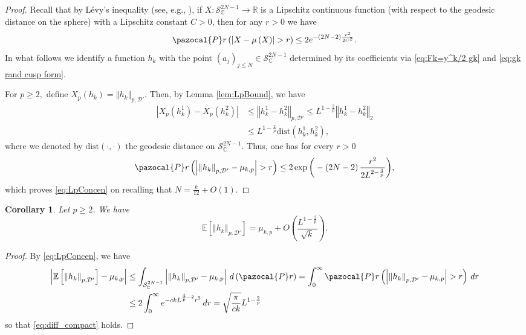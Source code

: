 \documentclass[12pt, a4paper]{amsart}
\newtheorem{corollary}[theorem]{Corollary}
\theoremstyle{definition}
\newcommand {\1} {\mathbf{1}}
\newcommand{\prob}{\pazocal{P}r}
\newcommand {\Dc} {\mathcal{D}}
\newcommand{\Scc}{{\mathcal{S}}}
\newcommand{\lk}{{L}}
\numberwithin{equation}{section}
\begin{document}
\begin{proof}
Recall that by L\'evy's inequality (see, e.g., \cite[Proposition 1.3 and Theorem 2.3]{Ledoux}),
if $X:\Scc_{\mathbb{C}}^{2N-1}\to\mathbb{R}$ is a Lipschitz continuous function (with respect to the geodesic
distance on the sphere) with a Lipschitz constant $C>0$, then for any
$r>0$ we have
\begin{equation}
\prob\left(\left|X-\mu\left(X\right)\right|>r\right)\le2e^{-\left(2N-2\right)\frac{r^{2}}{2C^{2}}}.\label{eq:prob_conc}
\end{equation}
In what follows we identify a function $h_{k}$ with the point $\left(a_{j}\right)_{j\le N}\in \Scc_{\mathbb{C}}^{2N-1}$
determined by its coefficients via \eqref{eq:Fk=y^k/2 gk} and \eqref{eq:gk rand cusp form}.

For
$p\ge2,$ define $X_{p}\left(h_{k}\right)=\left\Vert h_{k}\right\Vert _{p,\Dc'}$.
Then, by Lemma \ref{lem:LpBound}, we have
\begin{align*}
\left|X_{p}\left(h_{k}^{1}\right)-X_{p}\left(h_{k}^{2}\right)\right| & \le\left\Vert h_{k}^{1}-h_{k}^{2}\right\Vert _{p,\Dc'}\le \lk^{1-\frac2p}\left\Vert h_{k}^{1}-h_{k}^{2}\right\Vert _{2}\\
 & \le \lk^{1-\frac2p} \text{dist}\left(h_{k}^{1},h_{k}^{2}\right),
\end{align*}
where we denoted by $\text{dist}\left(\cdot,\cdot\right)$
the geodesic distance on $\Scc_{\mathbb{C}}^{2N-1}$. Thus,
one has for every $r>0$
\[
\prob\left(\left|\left\Vert h_{k}\right\Vert _{p,\Dc'}-\mu_{k,p}\right|>r\right)\le
2\exp\bigg(-\left(2N-2\right)\frac{r^{2}}{2 \lk^{2-\frac4p}}\bigg),
\]
which proves \eqref{eq:LpConcen} on recalling that $N= \frac{k}{12} + O(1)$. \end{proof}
\begin{corollary}
\label{cor:Exp_Med_diff}Let $p\ge2$.
We have
\begin{equation}
\label{eq:diff_compact}
\mathbb{E}\left[\left\Vert h_{k}\right\Vert _{p,\Dc'}\right]=\mu_{k,p}+O\left( \frac{L^{1-\frac2p}}{\sqrt{k}}\right).
\end{equation}

\end{corollary}

\begin{proof}
By \eqref{eq:LpConcen}, we have
\begin{align*}
\left|\mathbb{E}\left[\left\Vert h_{k}\right\Vert _{p,\Dc'}\right]-\mu_{k,p}\right| & \le\int_{\Scc_{\mathbb{C}}^{2N-1}}\left|\left\Vert h_{k}\right\Vert _{p,\Dc'}-\mu_{k,p}\right|\,d\left(\prob\right)=\int_{0}^{\infty}\prob\left(\left|\left\Vert h_{k}\right\Vert _{p,\Dc'}-\mu_{k,p}\right|>r\right)\,dr\\
 & \le2\int_{0}^{\infty}e^{-c k L^{\frac4p-2}r^{2}}\,dr=\sqrt{\frac{\pi}{c k}} L^{1-\frac2p}
\end{align*}
so that \eqref{eq:diff_compact} holds.



\end{proof}
\end{document}
